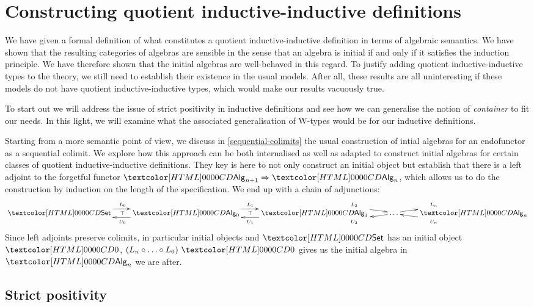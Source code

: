 \chapter{Constructing quotient inductive-inductive definitions}
\label{constructing}

We have given a formal definition of what constitutes a quotient
inductive-inductive definition in terms of algebraic semantics. We
have shown that the resulting categories of algebras are sensible in
the sense that an algebra is initial if and only if it satisfies the
induction principle. We have therefore shown that the initial algebras
are well-behaved in this regard. To justify adding quotient
inductive-inductive types to the theory, we still need to establish
their existence in the usual models. After all, these results are all
uninteresting if these models do not have quotient inductive-inductive
types, which would make our results vacuously true.

To start out we will address the issue of strict positivity in
inductive definitions and see how we can generalise the notion of
\emph{container} to fit our needs. In this light, we will examine what
the associated generalisation of W-types would be for our inductive
definitions.

Starting from a more semantic point of view, we discuss in
\cref{sequential-colimits} the usual construction of intial algebras
for an endofunctor as a sequential colimit. We explore how this
approach can be both internalised as well as adapted to construct
initial algebras for certain classes of quotient inductive-inductive
definitions. They key is here to not only construct an initial object
but establish that there is a left adjoint to the forgetful functor
$\Func{\Alg_{n+1}}{\Alg_{n}}$, which allows us to do the construction by
induction on the length of the specification. We end up with a chain
of adjunctions:
$$
\xymatrix{
\Set \ar@/^/[r]^{L_0}
\ar@{}[r]|{\top} 
&\Alg_0 \ar@/^/[l]^{U_0} \ar@/^/[r]^{L_1} 
\ar@{}[r]|{\top} 
&\Alg_1 \ar@/^/[l]^{U_1} \ar@/^/[r]^{L_2} 
\ar@{}[r]|{\top} 
&\hdots \ar@/^/[l]^{U_2} \ar@/^/[r]^{L_n} 
\ar@{}[r]|{\top} 
&\Alg_n \ar@/^/[l]^{U_n}
}
$$
Since left adjoints preserve colimits, in particular initial objects
and $\Set$ has an initial object $\emptyty$,
$(L_n \circ \hdots \circ L_0)\ \emptyty$ gives us the initial algebra
in $\Alg_n$ we are after.

\section{Strict positivity}

